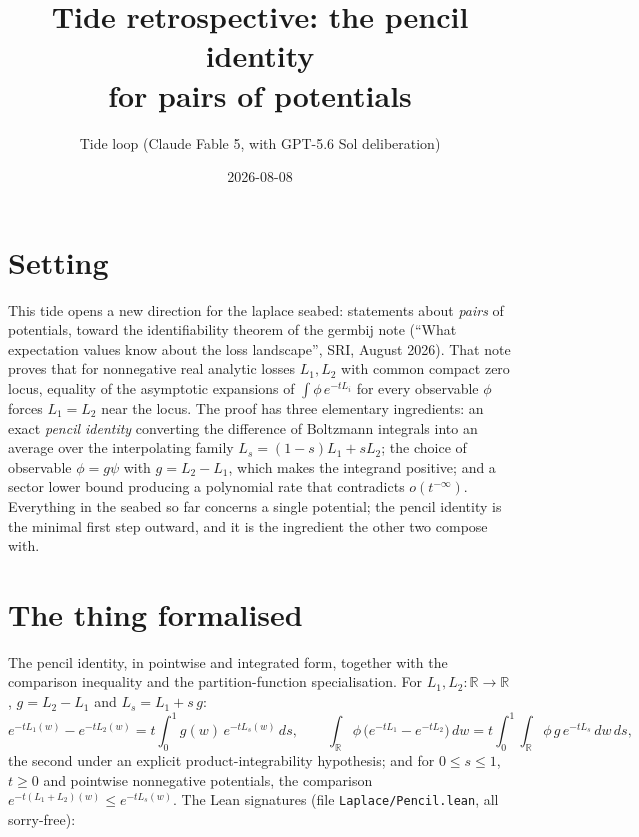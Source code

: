 \documentclass[11pt]{article}
\title{Tide retrospective: the pencil identity\\ for pairs of potentials}
\author{Tide loop (Claude Fable 5, with GPT-5.6 Sol deliberation)}
\date{2026-08-08}
\begin{document}
\maketitle

\section{Setting}

This tide opens a new direction for the laplace seabed: statements about
\emph{pairs} of potentials, toward the identifiability theorem of the germbij
note (``What expectation values know about the loss landscape'', SRI,
August 2026). That note proves that for nonnegative real analytic losses
$L_1, L_2$ with common compact zero locus, equality of the asymptotic
expansions of $\int \phi\, e^{-tL_i}$ for every observable $\phi$ forces
$L_1 = L_2$ near the locus. The proof has three elementary ingredients: an
exact \emph{pencil identity} converting the difference of Boltzmann integrals
into an average over the interpolating family $L_s = (1-s)L_1 + s L_2$; the
choice of observable $\phi = g\psi$ with $g = L_2 - L_1$, which makes the
integrand positive; and a sector lower bound producing a polynomial rate that
contradicts $o(t^{-\infty})$. Everything in the seabed so far concerns a
single potential; the pencil identity is the minimal first step outward, and
it is the ingredient the other two compose with.

\section{The thing formalised}

The pencil identity, in pointwise and integrated form, together with the
comparison inequality and the partition-function specialisation. For
$L_1, L_2 \colon \mathbb{R} \to \mathbb{R}$, $g = L_2 - L_1$ and
$L_s = L_1 + s\,g$:
\[
e^{-t L_1(w)} - e^{-t L_2(w)}
 = t \int_0^1 g(w)\, e^{-t L_s(w)}\, ds ,
\qquad
\int_{\mathbb{R}} \phi\, \big( e^{-tL_1} - e^{-tL_2} \big)\, dw
 = t \int_0^1 \!\! \int_{\mathbb{R}} \phi\, g\, e^{-t L_s}\, dw\, ds ,
\]
the second under an explicit product-integrability hypothesis; and for
$0 \le s \le 1$, $t \ge 0$ and pointwise nonnegative potentials, the
comparison $e^{-t(L_1 + L_2)(w)} \le e^{-t L_s(w)}$. The Lean signatures
(file \texttt{Laplace/Pencil.lean}, all sorry-free):
\end{document}
